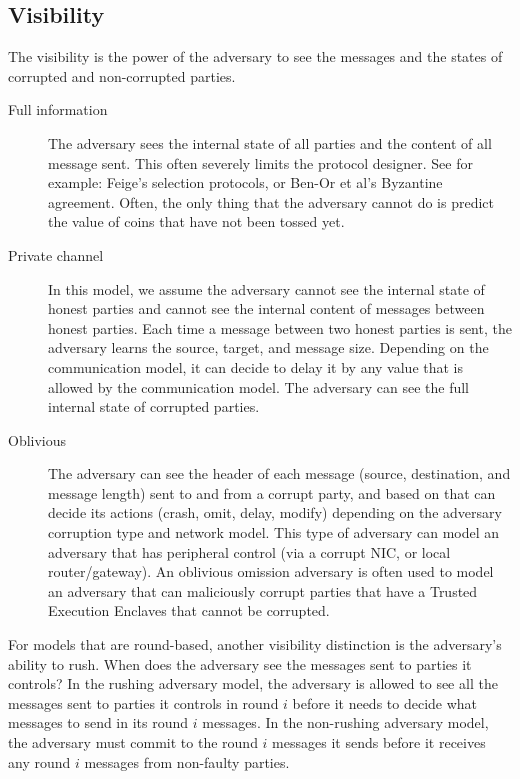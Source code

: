 \subsection{Visibility}
The visibility is the power of the adversary to see the messages and the states of corrupted and non-corrupted parties.

\begin{description}
    \item[Full information] The adversary sees the internal state of all parties and the content of all
    message sent. 
    This often severely limits the protocol designer. 
    See for example: Feige's selection protocols, or Ben-Or et al's Byzantine agreement.
    Often, the only thing that the adversary cannot do is predict the value of coins that have not been tossed yet.
    
    \item[Private channel] 
    In this model, we assume the adversary cannot see the internal state of honest 
    parties and cannot see the internal content of messages between honest parties. 
    Each time a message between two honest parties is sent, the adversary learns the 
    source, target, and message size. 
    Depending on the communication model, it can decide to delay it by any value that is 
    allowed by the communication model. The adversary can see the full 
    internal state of corrupted parties.

    \item[Oblivious] The adversary can see the header of each message (source, destination, and message 
    length) sent to and from a corrupt party, and based on that can decide its actions 
    (crash, omit, delay, modify) depending on the adversary corruption type and network model. 
    This type of adversary can model an adversary that has peripheral control 
    (via a corrupt NIC, or local router/gateway). 
    An oblivious omission adversary is often used to model an adversary that can maliciously 
    corrupt parties that have a Trusted Execution Enclaves that cannot be corrupted.
\end{description}


For models that are round-based, another visibility distinction is the 
adversary's ability to rush. When does the adversary see the messages sent to 
parties it controls? In the rushing adversary model, the adversary is allowed to see 
all the messages sent to parties it controls in round $i$ before it needs to decide what messages 
to send in its round $i$ messages. In the non-rushing adversary model, the adversary 
must commit to the round $i$ messages it sends before it receives any round $i$ messages from non-faulty parties.

